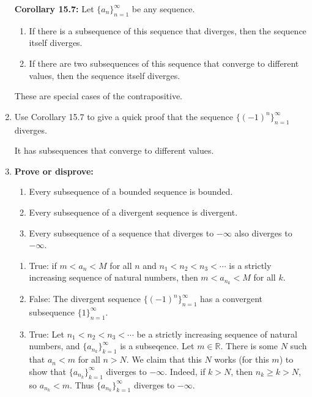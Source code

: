 \documentclass[12pt]{amsart}
\newcommand{\R}{{\mathbb{R}}}
\numberwithin{equation}{section}
\theoremstyle{plain} %
\theoremstyle{definition}
\theoremstyle{remark}
\begin{document}
\begin{enumerate}
\noindent \textbf{Corollary 15.7:} Let $\{a_n\}_{n=1}^\infty$ be any sequence.
\begin{enumerate}
\item If there is a subsequence of this sequence that diverges, then the sequence itself diverges.
\item If there are two subsequences of this sequence that converge to different values, then the sequence itself diverges.
\end{enumerate}

\begin{framed} These are special cases of the contrapositive.
\end{framed}




\item Use Corollary 15.7 to give a quick proof that the sequence $\{ (-1)^n \}_{n=1}^\infty$ diverges.

\begin{framed} It has subsequences that converge to different values.
\end{framed}

\item \textbf{Prove or disprove:}
\begin{enumerate}


\item Every subsequence of a bounded sequence is bounded.



\item Every subsequence of a divergent sequence is divergent.



\item Every subsequence of a sequence that diverges to $-\infty$ also diverges to $-\infty$.
\end{enumerate}

\begin{framed}\begin{enumerate}


\item True: if $m < a_n < M$ for all $n$ and $n_1<n_2 < n_3<\cdots$ is a strictly increasing sequence of natural numbers, then $m < a_{n_k} < M$ for all $k$.


\item False: The divergent sequence $\{(-1)^n\}_{n=1}^\infty$ has a convergent subsequence $\{1\}_{n=1}^\infty$.



\item True: Let $n_1<n_2<n_3 < \cdots$ be a strictly increasing sequence of natural numbers, and $\{a_{n_k}\}_{k=1}^\infty$ is a subseqence. Let $m\in \R$. There is some $N$ such that $a_n < m$ for all $n>N$. We claim that this $N$ works (for this $m$) to show that $\{a_{n_k}\}_{k=1}^\infty$  diverges to $-\infty$. Indeed, if $k>N$, then $n_k \geq k >N$, so $a_{n_k} <m$. Thus $\{a_{n_k}\}_{k=1}^\infty$  diverges to $-\infty$.
\end{enumerate}\end{framed}
\end{enumerate}
\end{document}
